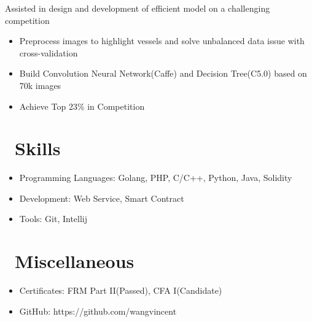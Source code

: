 \documentclass{resume}
\begin{document}
Assisted in design and development of efficient model on a challenging competition
\begin{itemize}
  \item Preprocess images to highlight vessels and solve unbalanced data issue with cross-validation
  \item Build Convolution Neural Network(Caffe) and Decision Tree(C5.0) based on 70k images
  \item Achieve Top 23\% in Competition
\end{itemize}


\section{\faCogs\ Skills}
\begin{itemize}[parsep=0.5ex]
  \item Programming Languages: Golang, PHP, C/C++, Python, Java, Solidity
  \item Development: Web Service, Smart Contract
  \item Tools: Git, Intellij
\end{itemize}

\section{\faInfo\ Miscellaneous}
\begin{itemize}[parsep=0.5ex]
  \item Certificates: FRM Part II(Passed), CFA I(Candidate)
  \item GitHub: https://github.com/wangvincent
\end{itemize}

%
%
\end{document}
